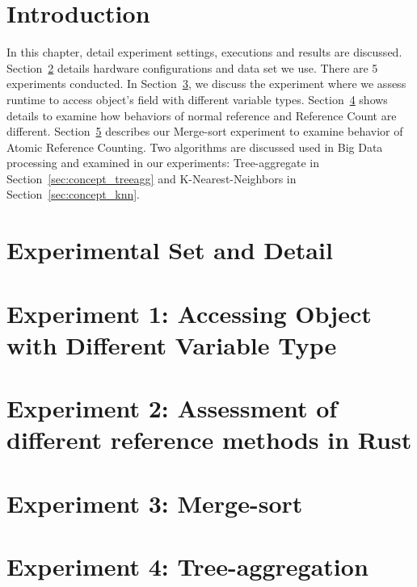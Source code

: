\section{Introduction}
\label{sec:eval_intro}
In this chapter, detail experiment settings, executions and results are discussed.
Section~\ref{sec:eval_setdetail} details hardware configurations and data set we use. 
There are 5 experiments conducted. In Section~\ref{sec:eval_diffval}, we discuss the experiment 
where we assess runtime to access object's field with different variable types. 
Section~\ref{sec:eval_refcount} shows details to examine how behaviors of normal reference and Reference Count are different. 
Section~\ref{sec:eval_sort} describes our Merge-sort experiment to examine behavior of Atomic Reference Counting.
Two algorithms are discussed used in Big Data processing and examined in our experiments: 
Tree-aggregate in Section~\ref{sec:concept_treeagg} and K-Nearest-Neighbors in Section~\ref{sec:concept_knn}.

\section{Experimental Set and Detail}
\label{sec:eval_setdetail}


\section{Experiment 1: Accessing Object with Different Variable Type}
\label{sec:eval_diffval}


\section{Experiment 2: Assessment of different reference methods in Rust}
\label{sec:eval_refcount}


\section{Experiment 3: Merge-sort}
\label{sec:eval_sort}



\section{Experiment 4: Tree-aggregation}
\label{sec:eval_treeagg}


